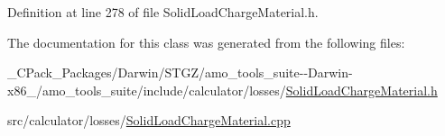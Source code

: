 Definition at line 278 of file Solid\+Load\+Charge\+Material.\+h.



The documentation for this class was generated from the following files\+:\begin{DoxyCompactItemize}
\item 
\+\_\+\+C\+Pack\+\_\+\+Packages/\+Darwin/\+S\+T\+G\+Z/amo\+\_\+tools\+\_\+suite-\/-\/\+Darwin-\/x86\+\_/amo\+\_\+tools\+\_\+suite/include/calculator/losses/\hyperlink{___c_pack___packages_2_darwin_2_s_t_g_z_2amo__tools__suite--_darwin-x86__64_2amo__tools__suite_24924830b9aa131be7fc658c83ea6c4c5}{Solid\+Load\+Charge\+Material.\+h}\item 
src/calculator/losses/\hyperlink{_solid_load_charge_material_8cpp}{Solid\+Load\+Charge\+Material.\+cpp}\end{DoxyCompactItemize}
